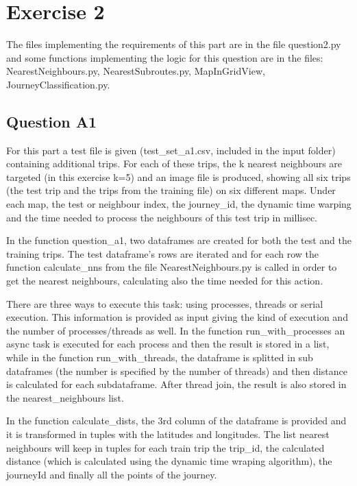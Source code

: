 \documentclass[12pt]{article}
\begin{document}
	\section{Exercise 2}
	The files implementing the requirements of this part are in the file question2.py and some functions implementing the logic for this question are in the files: NearestNeighbours.py, NearestSubroutes.py, MapInGridView, JourneyClassification.py.
	
	\subsection{Question A1}
	For this part a test file is given (test\_set\_a1.csv, included in the input folder) containing additional trips. For each of these trips, the k nearest neighbours are targeted (in this exercise k=5) and an image file is produced, showing all six trips (the test trip and the trips from the training file) on six different maps. Under each map, the test or neighbour index, the journey\_id, the dynamic time warping and the time needed to process the neighbours of this test trip in millisec.
	
	In the function question\_a1, two dataframes are created for both the test and the training trips. The test dataframe's rows are iterated and for each row the function calculate\_nns from the file NearestNeighbours.py is called in order to get the nearest neighbours, calculating also the time needed for this action.
	
	There are three ways to execute this task: using processes, threads or serial execution. This information is provided as input giving the kind of execution and the number of processes/threads as well. In the function run\_with\_processes an async task is executed for each process and then the result is stored in a list, while in the function run\_with\_threads, the dataframe is splitted in sub dataframes (the number is specified by the number of threads) and then distance is calculated for each subdataframe. After thread join, the result is also stored in the nearest\_neighbours list.
	
	In the function calculate\_dists, the 3rd column of the dataframe is provided and it is transformed in tuples with the latitudes and longitudes. The list nearest neighbours will keep in tuples for each train trip the trip\_id, the calculated distance (which is calculated using the dynamic time wraping algorithm), the journeyId and finally all the points of the journey. 
	
\end{document}
